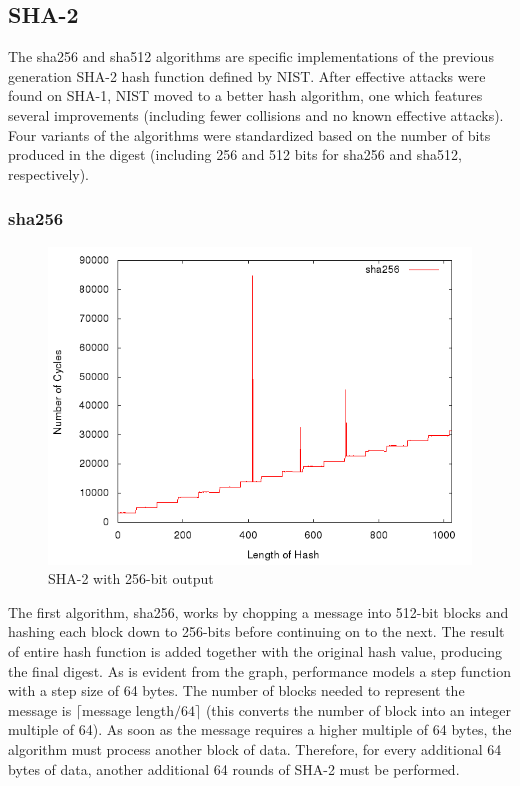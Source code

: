 \documentclass[10pt,a4paper]{article}
\begin{document}
\subsection{SHA-2}
The sha256 and sha512 algorithms are specific implementations of the previous generation SHA-2 hash function defined by NIST.  After effective attacks were found on SHA-1, NIST moved to a better hash algorithm, one which features several improvements (including fewer collisions and no known effective attacks).  Four variants of the algorithms were standardized based on the number of bits produced in the digest (including 256 and 512 bits for sha256 and sha512, respectively).

\subsubsection{sha256}
    \begin{figure}[H]
        \begin{center}
            \includegraphics[scale=0.5]{images/sha256.png} 
            \caption{SHA-2 with 256-bit output}
        \end{center}
    \end{figure}

The first algorithm, sha256, works by chopping a message into 512-bit blocks and hashing each block down to 256-bits before continuing on to the next.  The result of entire hash function is added together with the original hash value, producing the final digest.  As is evident from the graph, performance models a step function with a step size of 64 bytes.  The number of blocks needed to represent the message is $\lceil$message length$/ 64 \rceil$ (this converts the number of block into an integer multiple of 64).  As soon as the message requires a higher multiple of 64 bytes, the algorithm must process another block of data.  Therefore, for every additional 64 bytes of data, another additional 64 rounds of SHA-2 must be performed.
\end{document}
